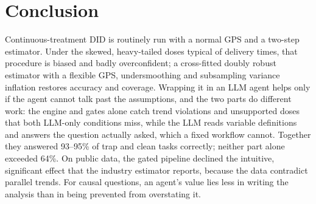 \documentclass[sigconf,anonymous,review]{acmart}
\begin{document}
\section{Conclusion}
Continuous-treatment DID is routinely run with a normal GPS and a two-step estimator. Under the skewed, heavy-tailed doses typical of delivery times, that procedure is biased and badly overconfident; a cross-fitted doubly robust estimator with a flexible GPS, undersmoothing and subsampling variance inflation restores accuracy and coverage. Wrapping it in an LLM agent helps only if the agent cannot talk past the assumptions, and the two parts do different work: the engine and gates alone catch trend violations and unsupported doses that both LLM-only conditions miss, while the LLM reads variable definitions and answers the question actually asked, which a fixed workflow cannot. Together they answered 93--95\% of trap and clean tasks correctly; neither part alone exceeded 64\%. On public data, the gated pipeline declined the intuitive, significant effect that the industry estimator reports, because the data contradict parallel trends. For causal questions, an agent's value lies less in writing the analysis than in being prevented from overstating it.



\end{document}
